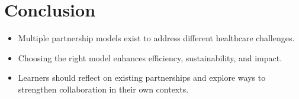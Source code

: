 \documentclass[10pt]{article}
\begin{document}
\section*{Conclusion}
\begin{itemize}
  \item Multiple partnership models exist to address different healthcare challenges.
  \item Choosing the right model enhances efficiency, sustainability, and impact.
  \item Learners should reflect on existing partnerships and explore ways to strengthen collaboration in their own contexts.
\end{itemize}
\end{document}
